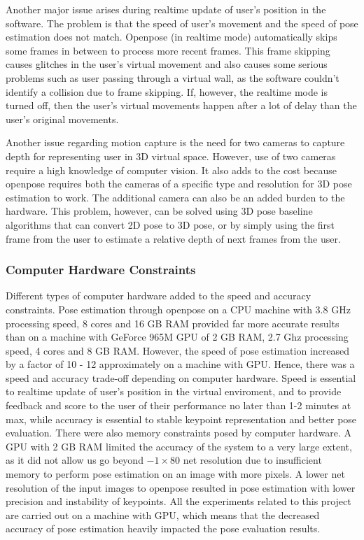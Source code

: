 Another major issue arises during realtime update of user's position in the software. The problem is that the speed of user's movement and the speed of pose estimation does not match. Openpose (in realtime mode) automatically skips some frames in between to process more recent frames. This frame skipping causes glitches in the user's virtual movement and also causes some serious problems such as user passing through a virtual wall, as the software couldn't identify a collision due to frame skipping. If, however, the realtime mode is turned off, then the user's virtual movements happen after a lot of delay than the user's original movements. 


Another issue regarding motion capture is the need for two cameras to capture depth for representing user in 3D virtual space. However, use of two cameras require a high knowledge of computer vision. It also adds to the cost because openpose requires both the cameras of a specific type and resolution for 3D pose estimation to work. The additional camera can also be an added burden to the hardware. This problem, however, can be solved using 3D pose baseline algorithms that can convert 2D pose to 3D pose, or by simply using the first frame from the user to estimate a relative depth of next frames from the user. 

\subsubsection{Computer Hardware Constraints}
Different types of computer hardware added to the speed and accuracy constraints. Pose estimation through openpose on a CPU machine with 3.8 GHz processing speed, 8 cores and 16 GB RAM provided far more accurate results than on a machine with GeForce 965M GPU of 2 GB RAM, 2.7 Ghz processing speed, 4 cores and 8 GB RAM. However, the speed of pose estimation increased by a factor of 10 - 12 approximately on a machine with GPU. Hence, there was a speed and accuracy trade-off depending on computer hardware. Speed is essential to realtime update of user's position in the virtual enviroment, and to provide feedback and score to the user of their performance no later than 1-2 minutes at max, while accuracy is essential to stable keypoint representation and better pose evaluation. There were also memory constraints posed by computer hardware. A GPU with 2 GB RAM limited the accuracy of the system to a very large extent, as it did not allow us go beyond $-1 \times 80$ net resolution due to insufficient memory to perform pose estimation on an image with more pixels. A lower net resolution of the input images to openpose resulted in pose estimation with lower precision and instability of keypoints. All the experiments related to this project are carried out on a machine with GPU, which means that the decreased accuracy of pose estimation heavily impacted the pose evaluation results. 

